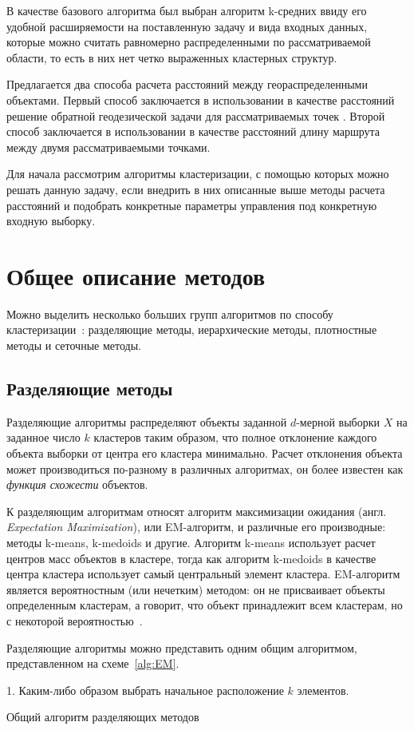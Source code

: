 В качестве базового алгоритма был выбран алгоритм k-средних ввиду его удобной расширяемости на поставленную задачу и вида входных данных, которые можно считать равномерно распределенными по рассматриваемой области, то есть в них нет четко выраженных кластерных структур.

Предлагается два способа расчета расстояний между геораспределенными объектами. Первый способ заключается в использовании в качестве расстояний решение обратной геодезической задачи для рассматриваемых точек \cite{geodesic}. Второй способ заключается в использовании в качестве расстояний длину маршрута между двумя рассматриваемыми точками.

Для начала рассмотрим алгоритмы кластеризации, с помощью которых можно решать данную задачу, если внедрить в них описанные выше методы расчета расстояний и подобрать конкретные параметры управления под конкретную входную выборку.

\section{Общее описание методов}
Можно выделить несколько больших групп алгоритмов по способу кластеризации~\cite{cod}: разделяющие методы, иерархические методы, плотностные методы и сеточные методы.

\subsection{Разделяющие методы}
Разделяющие алгоритмы распределяют объекты заданной \( d \)-мерной выборки \( X \) на заданное число \( k \) кластеров таким образом, что полное отклонение каждого объекта выборки от центра его кластера минимально. Расчет отклонения объекта может производиться по-разному в различных алгоритмах, он более известен как \emph{функция схожести} объектов.

К разделяющим алгоритмам относят алгоритм максимизации ожидания (англ. \emph{Expectation Maximization}), или EM-алгоритм, и различные его производные: методы k-means, k-medoids и другие. Алгоритм k-means использует расчет центров масс объектов в кластере, тогда как алгоритм k-medoids в качестве центра кластера использует самый центральный элемент кластера. EM-алгоритм является вероятностным (или нечетким) методом: он не присваивает объекты определенным кластерам, а говорит, что объект принадлежит всем кластерам, но с некоторой вероятностью~\cite{cod, neiskiy, voron, dbscan-pos}.

Разделяющие алгоритмы можно представить одним общим алгоритмом, представленном на схеме~\ref{alg:EM}.
\begin{algorithm}
    1. Каким-либо образом выбрать начальное расположение \( k \) элементов. 
    \caption{Общий алгоритм разделяющих методов}
    \label{alg:EM}
\end{algorithm}

